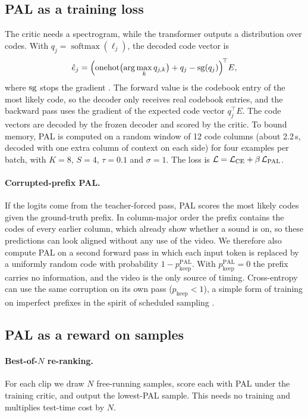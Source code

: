 \subsection{PAL as a training loss}
\label{sec:pal-loss}

The critic needs a spectrogram, while the transformer outputs a distribution over codes. With $q_j = \operatorname{softmax}(\ell_j)$, the decoded code vector is
\begin{equation}
  \hat e_j = \Bigl(\operatorname{onehot}\bigl(\arg\max_k q_{j,k}\bigr) + q_j - \operatorname{sg}(q_j)\Bigr)^{\!\top} E ,
  \label{eq:st}
\end{equation}
where $\operatorname{sg}$ stops the gradient \citep{bengio2013estimating}. The forward value is the codebook entry of the most likely code, so the decoder only receives real codebook entries, and the backward pass uses the gradient of the expected code vector $q_j^{\top} E$. The code vectors are decoded by the frozen decoder and scored by the critic. To bound memory, PAL is computed on a random window of 12 code columns (about 2.2\,s, decoded with one extra column of context on each side) for four examples per batch, with $K = 8$, $S = 4$, $\tau = 0.1$ and $\sigma = 1$. The loss is $\mathcal{L} = \mathcal{L}_{\mathrm{CE}} + \beta\,\mathcal{L}_{\mathrm{PAL}}$.

\paragraph{Corrupted-prefix PAL.}
If the logits come from the teacher-forced pass, PAL scores the most likely codes given the ground-truth prefix. In column-major order the prefix contains the codes of every earlier column, which already show whether a sound is on, so these predictions can look aligned without any use of the video. We therefore also compute PAL on a second forward pass in which each input token is replaced by a uniformly random code with probability $1 - p^{\mathrm{PAL}}_{\mathrm{keep}}$. With $p^{\mathrm{PAL}}_{\mathrm{keep}} = 0$ the prefix carries no information, and the video is the only source of timing. Cross-entropy can use the same corruption on its own pass ($p_{\mathrm{keep}} < 1$), a simple form of training on imperfect prefixes in the spirit of scheduled sampling \citep{bengio2015scheduled}.

\subsection{PAL as a reward on samples}
\label{sec:reward}

\paragraph{Best-of-$N$ re-ranking.}
For each clip we draw $N$ free-running samples, score each with PAL under the training critic, and output the lowest-PAL sample. This needs no training and multiplies test-time cost by $N$.

